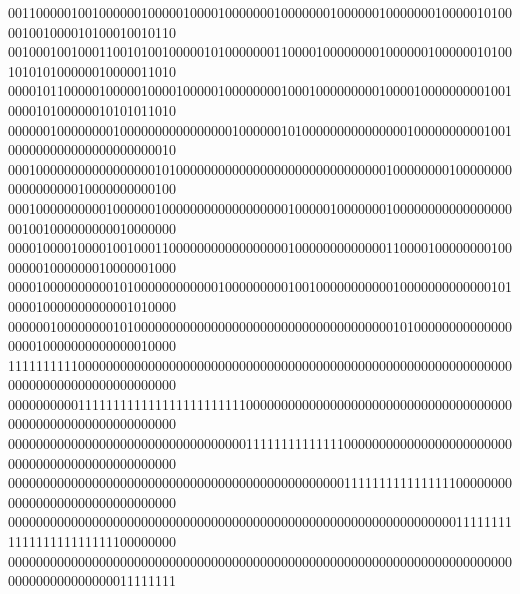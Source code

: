 \begin{tabbing}
001100000100100000010000010000100000001000000010000001000000010000010100001001000010100010010110\\[0pt]
001000100100011001010010000010100000001100001000000001000000100000010100101010100000010000011010\\[0pt]
000010110000010000010000100000100000000100010000000001000010000000001001000010100000010101011010\\[0pt]
000000100000000100000000000000001000000101000000000000000100000000001001000000000000000000000010\\[0pt]
000100000000000000000101000000000000000000000000000000100000000100000000000000000010000000000100\\[0pt]
000100000000001000000100000000000000000010000010000000100000000000000000001001000000000010000000\\[0pt]
000010000100001001000110000000000000000010000000000000110000100000000100000001000000010000001000\\[0pt]
000010000000000101000000000000100000000010010000000000010000000000000101000010000000000001010000\\[0pt]
000000100000000101000000000000000000000000000000000000010100000000000000000010000000000000010000\\[0pt]
111111111100000000000000000000000000000000000000000000000000000000000000000000000000000000000000\\[0pt]
000000000011111111111111111111111100000000000000000000000000000000000000000000000000000000000000\\[0pt]
000000000000000000000000000000000011111111111111000000000000000000000000000000000000000000000000\\[0pt]
000000000000000000000000000000000000000000000000111111111111111100000000000000000000000000000000\\[0pt]
000000000000000000000000000000000000000000000000000000000000000011111111111111111111111100000000\\[0pt]
000000000000000000000000000000000000000000000000000000000000000000000000000000000000000011111111\\[0pt]
\end{tabbing}
